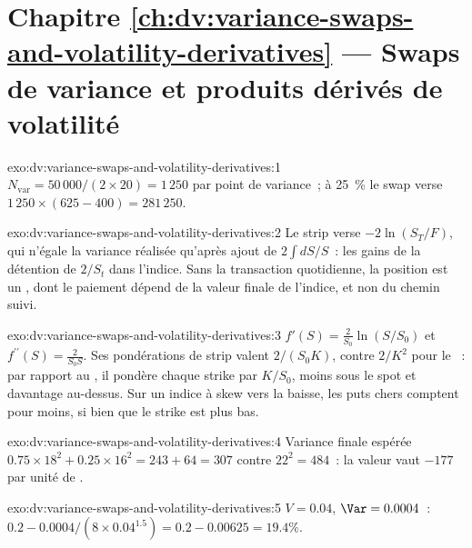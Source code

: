 \section*{Chapitre \ref{ch:dv:variance-swaps-and-volatility-derivatives} --- Swaps de variance et produits dérivés de volatilité}

\begin{solution}{exo:dv:variance-swaps-and-volatility-derivatives:1}
$N_{\mathrm{var}}=50\,000/(2\times20)=1\,250$ par point de variance~; à 25~\% le swap verse
$1\,250\times(625-400)=281\,250$.
\end{solution}

\begin{solution}{exo:dv:variance-swaps-and-volatility-derivatives:2}
Le strip verse $-2\ln(S_T/F)$, qui n'égale la variance réalisée qu'après ajout de $2\int dS/S$~: les gains de la détention de
$2/S_t$ dans l'indice. Sans la transaction quotidienne, la position est un , dont le paiement dépend de la
valeur finale de l'indice, et non du chemin suivi.
\end{solution}

\begin{solution}{exo:dv:variance-swaps-and-volatility-derivatives:3}
$f'(S)=\frac2{S_0}\ln(S/S_0)$ et $f^{\prime\prime}(S)=\frac2{S_0S}$. Ses pondérations de strip valent $2/(S_0K)$, contre $2/K^2$ pour le
~: par rapport au , il pondère chaque strike par $K/S_0$, moins sous le spot et davantage au-dessus.
Sur un indice à skew vers la baisse, les puts chers comptent pour moins, si bien que le strike est plus bas.
\end{solution}

\begin{solution}{exo:dv:variance-swaps-and-volatility-derivatives:4}
Variance finale espérée $0.75\times18^2+0.25\times16^2=243+64=307$ contre $22^2=484$~: la valeur vaut $-177$ par unité de
.
\end{solution}

\begin{solution}{exo:dv:variance-swaps-and-volatility-derivatives:5}
$V=0.04$, $\Var=0.0004$~: $0.2-0.0004/(8\times0.04^{1.5})=0.2-0.00625=19.4\%$.
\end{solution}

